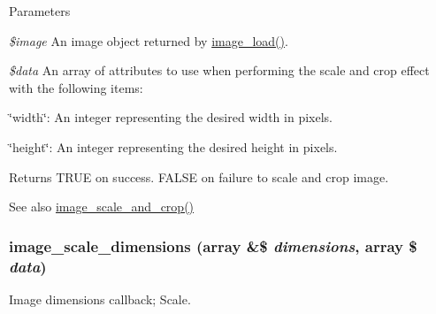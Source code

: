 \begin{DoxyParams}{Parameters}
\item[{\em \$image}]An image object returned by \hyperlink{group__image_ga96098e5b039dc3906a656fa889a04776}{image\_\-load()}. \item[{\em \$data}]An array of attributes to use when performing the scale and crop effect with the following items:
\begin{DoxyItemize}
\item \char`\"{}width\char`\"{}: An integer representing the desired width in pixels.
\item \char`\"{}height\char`\"{}: An integer representing the desired height in pixels. 
\end{DoxyItemize}\end{DoxyParams}
\begin{DoxyReturn}{Returns}
TRUE on success. FALSE on failure to scale and crop image. 
\end{DoxyReturn}
\begin{DoxySeeAlso}{See also}
\hyperlink{group__image_ga8d6850eecb498cf1683808eb66b74465}{image\_\-scale\_\-and\_\-crop()} 
\end{DoxySeeAlso}
\hypertarget{image_8effects_8inc_ae48bbf6c76176bbda1608536ac46f125}{
\subsubsection[{image\_\-scale\_\-dimensions}]{\setlength{\rightskip}{0pt plus 5cm}image\_\-scale\_\-dimensions (array \&\$ {\em dimensions}, \/  array \$ {\em data})}}
\label{image_8effects_8inc_ae48bbf6c76176bbda1608536ac46f125}
Image dimensions callback; Scale.


